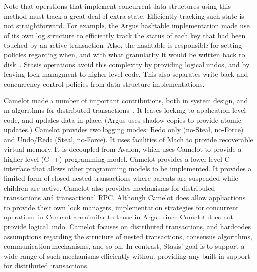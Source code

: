 \documentclass[letterpaper,twocolumn,10pt]{article}
\newcommand{\yad}{Stasis\xspace}
\newcommand{\yads}{Stasis'\xspace}
\begin{document}
Note that operations that implement concurrent data structures using
this method must track a great deal of extra state.  Efficiently
tracking such state is not straightforward.  For example, the Argus
hashtable implementation made use of its own log structure to
efficiently track the status of each key that had been touched by an
active transaction.  Also, the hashtable is responsible for setting
policies regarding when, and with what granularity it would be written
back to disk~\cite{argusImplementation}.  \yad operations avoid this
complexity by providing logical undos, and by leaving lock managment
to higher-level code.  This also separates write-back and concurrency
control policies from data structure implementations.


Camelot made a number of important
contributions, both in system design, and in algorithms for
distributed transactions~\cite{camelot}.  It leaves locking to application level code,
and updates data in place.  (Argus uses shadow copies to provide
atomic updates.)  Camelot provides two logging modes: Redo only
(no-Steal, no-Force) and Undo/Redo (Steal, no-Force).  It uses 
facilities of Mach to provide recoverable virtual memory.  It
is decoupled from Avalon, which uses Camelot to provide a
higher-level (C++) programming model.  Camelot provides a lower-level
C interface that allows other programming models to be
implemented.  It provides a limited form of closed nested transactions
where parents are suspended while children are active.  Camelot also
provides mechanisms for distributed transactions and transactional
RPC.  Although Camelot does allow appliactions to provide their own lock 
managers, implementation strategies for concurrent operations 
in Camelot are similar to those
in Argus since Camelot does not provide logical undo.  Camelot focuses
on distributed transactions, and hardcodes
assumptions regarding the structure of nested transactions, consensus
algorithms, communication mechanisms, and so on.  In contrast, \yads
goal is to support a wide range of such mechanisms efficiently without  
providing any built-in support for distributed transactions.
\end{document}
